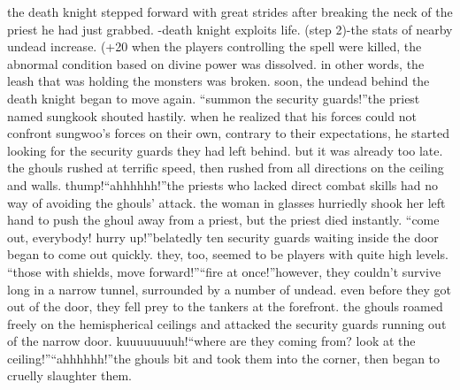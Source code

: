 the death knight stepped forward with great strides after breaking the neck of the priest he had just grabbed.
-death knight exploits life.
 (step 2)-the stats of nearby undead increase.
 (+20%
when the players controlling the spell were killed, the abnormal condition based on divine power was dissolved.
 in other words, the leash that was holding the monsters was broken.
 soon, the undead behind the death knight began to move again.
“summon the security guards!”the priest named sungkook shouted hastily.
 when he realized that his forces could not confront sungwoo’s forces on their own, contrary to their expectations, he started looking for the security guards they had left behind.
but it was already too late.
 the ghouls rushed at terrific speed, then rushed from all directions on the ceiling and walls.
thump!“ahhhhhh!”the priests who lacked direct combat skills had no way of avoiding the ghouls’ attack.
 the woman in glasses hurriedly shook her left hand to push the ghoul away from a priest, but the priest died instantly.
“come out, everybody! hurry up!”belatedly ten security guards waiting inside the door began to come out quickly.
 they, too, seemed to be players with quite high levels.
“those with shields, move forward!”“fire at once!”however, they couldn’t survive long in a narrow tunnel, surrounded by a number of undead.
 even before they got out of the door, they fell prey to the tankers at the forefront.
the ghouls roamed freely on the hemispherical ceilings and attacked the security guards running out of the narrow door.
kuuuuuuuuh!“where are they coming from? look at the ceiling!”“ahhhhhh!”the ghouls bit and took them into the corner, then began to cruelly slaughter them.


 